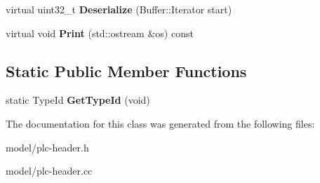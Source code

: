 \begin{DoxyCompactItemize}
\item 
\hypertarget{classns3_1_1PLC__PhyRatelessFrameControlHeader_a5f54be4017bd24d91f9cb2ed767668d9}{virtual uint32\-\_\-t {\bfseries \-Deserialize} (\-Buffer\-::\-Iterator start)}\label{classns3_1_1PLC__PhyRatelessFrameControlHeader_a5f54be4017bd24d91f9cb2ed767668d9}

\item 
\hypertarget{classns3_1_1PLC__PhyRatelessFrameControlHeader_ab2e5d71c2afcc0b502355cf1a0911e34}{virtual void {\bfseries \-Print} (std\-::ostream \&os) const }\label{classns3_1_1PLC__PhyRatelessFrameControlHeader_ab2e5d71c2afcc0b502355cf1a0911e34}

\end{DoxyCompactItemize}
\subsection*{\-Static \-Public \-Member \-Functions}
\begin{DoxyCompactItemize}
\item 
\hypertarget{classns3_1_1PLC__PhyRatelessFrameControlHeader_ab51a28abe813fe3d26352524b5fabd62}{static \-Type\-Id {\bfseries \-Get\-Type\-Id} (void)}\label{classns3_1_1PLC__PhyRatelessFrameControlHeader_ab51a28abe813fe3d26352524b5fabd62}

\end{DoxyCompactItemize}


\-The documentation for this class was generated from the following files\-:\begin{DoxyCompactItemize}
\item 
model/plc-\/header.\-h\item 
model/plc-\/header.\-cc\end{DoxyCompactItemize}
